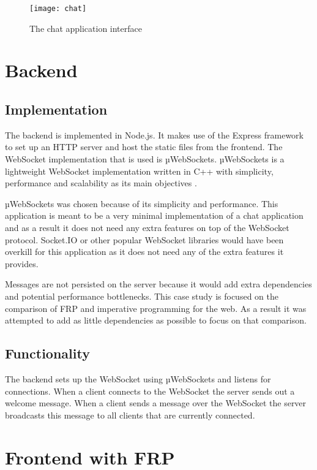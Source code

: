 \begin{figure}[H]
	\centering
	\texttt{[image: chat]}
	\caption{The chat application interface}
	\label{figure:chat}
\end{figure}

\section{Backend}

\subsection{Implementation}

The backend is implemented in Node.js. It makes use of the Express framework to set up an HTTP server and host the static files from the frontend. The WebSocket implementation that is used is µWebSockets. µWebSockets is a lightweight WebSocket implementation written in C++ with simplicity, performance and scalability as its main objectives \cite{uws}.

µWebSockets was chosen because of its simplicity and performance. This application is meant to be a very minimal implementation of a chat application and as a result it does not need any extra features on top of the WebSocket protocol. Socket.IO or other popular WebSocket libraries would have been overkill for this application as it does not need any of the extra features it provides.

Messages are not persisted on the server because it would add extra dependencies and potential performance bottlenecks. This case study is focused on the comparison of FRP and imperative programming for the web. As a result it was attempted to add as little dependencies as possible to focus on that comparison.

\subsection{Functionality}

The backend sets up the WebSocket using µWebSockets and listens for connections. When a client connects to the WebSocket the server sends out a welcome message. When a client sends a message over the WebSocket the server broadcasts this message to all clients that are currently connected.

\section{Frontend with FRP}
\label{sec:imp-frp}

